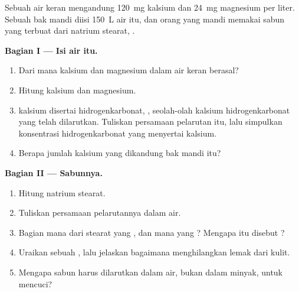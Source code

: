 \begin{problem}
\label{pb:g11:dissolution:1}
Sebuah air keran mengandung \qty{120}{mg}  kalsium dan \qty{24}{mg}
 magnesium per liter. Sebuah bak mandi diisi \qty{150}{L} air itu,
dan orang yang mandi memakai sabun yang terbuat dari natrium stearat,
.

\medskip
\noindent\textbf{Bagian I --- Isi air itu.}
\begin{enumerate}
  \item Dari mana  kalsium dan magnesium dalam air keran berasal?
  \item Hitung   kalsium dan  magnesium.
  \item {} kalsium disertai  hidrogenkarbonat, ,
        seolah-olah kalsium hidrogenkarbonat  yang telah
        dilarutkan. Tuliskan persamaan pelarutan itu, lalu simpulkan
        konsentrasi  hidrogenkarbonat yang menyertai kalsium.
  \item Berapa jumlah  kalsium yang dikandung bak mandi itu?
\end{enumerate}

\medskip
\noindent\textbf{Bagian II --- Sabunnya.}
\begin{enumerate}[resume]
  \item Hitung  natrium stearat.
  \item Tuliskan persamaan pelarutannya dalam air.
  \item Bagian mana dari  stearat yang , dan mana yang
        ? Mengapa  itu disebut ?
  \item Uraikan sebuah , lalu jelaskan bagaimana 
        menghilangkan lemak dari kulit.
  \item Mengapa sabun harus dilarutkan dalam air, bukan dalam minyak,
        untuk mencuci?
\end{enumerate}


\end{problem}
